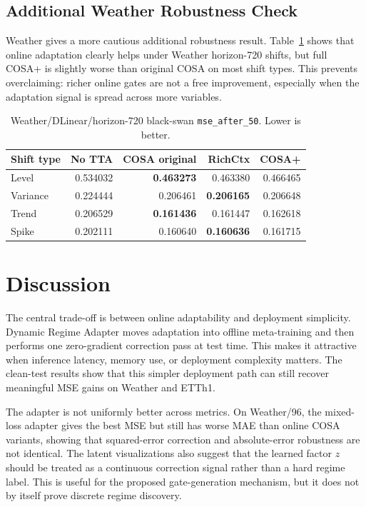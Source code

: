 \documentclass[10pt]{article}
\begin{document}
\FloatBarrier
\subsection{Additional Weather Robustness Check}
Weather gives a more cautious additional robustness result. Table~\ref{tab:weather-blackswan} shows that online adaptation clearly helps under Weather horizon-720 shifts, but full COSA+ is slightly worse than original COSA on most shift types. This prevents overclaiming: richer online gates are not a free improvement, especially when the adaptation signal is spread across more variables.

\begin{table}[!htbp]
\centering
\small
\caption{Weather/DLinear/horizon-720 black-swan \texttt{mse\_after\_50}. Lower is better.}
\label{tab:weather-blackswan}
\begin{tabular}{lrrrr}
\toprule
Shift type & No TTA & COSA original & RichCtx & COSA+ \\
\midrule
Level & 0.534032 & \textbf{0.463273} & 0.463380 & 0.466465 \\
Variance & 0.224444 & 0.206461 & \textbf{0.206165} & 0.206648 \\
Trend & 0.206529 & \textbf{0.161436} & 0.161447 & 0.162618 \\
Spike & 0.202111 & 0.160640 & \textbf{0.160636} & 0.161715 \\
\bottomrule
\end{tabular}
\end{table}

\FloatBarrier

\section{Discussion}
The central trade-off is between online adaptability and deployment simplicity. Dynamic Regime Adapter moves adaptation into offline meta-training and then performs one zero-gradient correction pass at test time. This makes it attractive when inference latency, memory use, or deployment complexity matters. The clean-test results show that this simpler deployment path can still recover meaningful MSE gains on Weather and ETTh1.

The adapter is not uniformly better across metrics. On Weather/96, the mixed-loss adapter gives the best MSE but still has worse MAE than online COSA variants, showing that squared-error correction and absolute-error robustness are not identical. The latent visualizations also suggest that the learned factor $z$ should be treated as a continuous correction signal rather than a hard regime label. This is useful for the proposed gate-generation mechanism, but it does not by itself prove discrete regime discovery.
\end{document}
